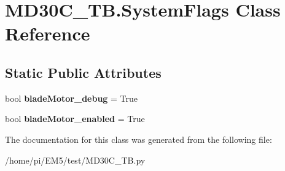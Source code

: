 \hypertarget{classMD30C__TB_1_1SystemFlags}{}\section{M\+D30\+C\+\_\+\+T\+B.\+System\+Flags Class Reference}
\label{classMD30C__TB_1_1SystemFlags}
\subsection*{Static Public Attributes}
\begin{DoxyCompactItemize}
\item 
\mbox{\label{classMD30C__TB_1_1SystemFlags_af8a9f860d5a624e9d978d137a4814c45}} 
bool {\bfseries blade\+Motor\+\_\+debug} = True
\item 
\mbox{\label{classMD30C__TB_1_1SystemFlags_ad9037238764bd6555ad72eea35cfc29c}} 
bool {\bfseries blade\+Motor\+\_\+enabled} = True
\end{DoxyCompactItemize}


The documentation for this class was generated from the following file\+:\begin{DoxyCompactItemize}
\item 
/home/pi/\+E\+M5/test/M\+D30\+C\+\_\+\+T\+B.\+py\end{DoxyCompactItemize}
